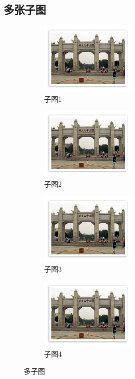 \subsection{多张子图}
\begin{figure}[h!] %
	\begin{subfigure}{0.55\textwidth}
		\centering
		\includegraphics[width=0.5\textwidth]{figure/fig1.png}
		\caption{子图1}
		\label{subfigA1}
	\end{subfigure}
	\begin{subfigure}{0.55\textwidth}
		\centering
		\includegraphics[width=0.5\textwidth]{figure/fig1.png} 
		\caption{子图2}
		\label{subfigA2}
	\end{subfigure}
	\begin{subfigure}{0.55\textwidth}
		\centering
		\includegraphics[width=0.5\textwidth]{figure/fig1.png}
		\caption{子图3}
		\label{subfigA3}
	\end{subfigure}
	\begin{subfigure}{0.55\textwidth}
		\centering
		\includegraphics[width=0.5\textwidth]{figure/fig1.png} 
		\caption{子图4}
		\label{subfigA4}
	\end{subfigure}
	\caption{多子图}
	\label{subfigA}
\end{figure}
